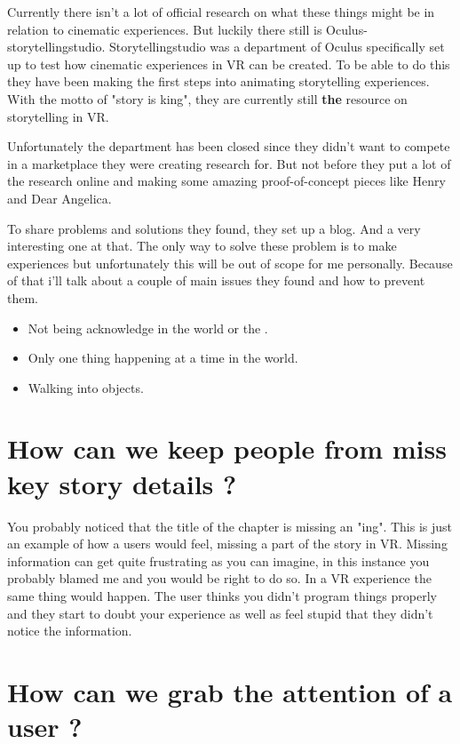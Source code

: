 \documentclass{report}
\begin{document}
				Currently there isn't a lot of official research on what these things might be in relation to cinematic experiences. But luckily there still is Oculus-storytellingstudio. Storytellingstudio was a department of Oculus specifically set up to test how cinematic experiences in VR can be created. To be able to do this they have been making the first steps into animating storytelling experiences. With the motto of "story is king", they are currently still \textbf{the} resource on storytelling in VR. 
				
				Unfortunately the department has been closed since they didn't want to compete in a marketplace they were creating research for. But not before they put a lot of the research online and making some amazing proof-of-concept pieces like Henry and Dear Angelica.
				
				
				To share problems and solutions they found, they set up a blog. And a very interesting one at that. The only way to solve these problem is to make experiences but unfortunately this will be out of scope for me personally. Because of that i'll talk about a couple of main issues they found and how to prevent them.
				
				\begin{itemize}
					\item Not being acknowledge in the world or the .
					\item Only one thing happening at a time in the world.
					\item Walking into objects.
				\end{itemize}
				
				
				
				\chapter{How can we keep people from miss key story details ?}
				
				You probably noticed that the title of the chapter is missing an "ing". This is just an example of how a users would feel, missing a part of the story in VR. Missing information can get quite frustrating as you can imagine, in this instance you probably blamed me and you would be right to do so. In a VR experience the same thing would happen. The user thinks you didn't program things properly and they start to doubt your experience as well as feel stupid that they didn't notice the information.
				
				\chapter{How can we grab the attention of a user ?}
				
\end{document}
